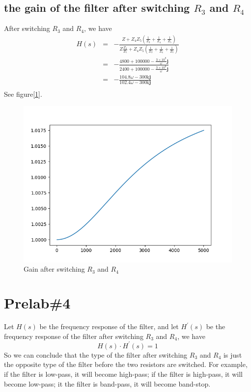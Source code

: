 \documentclass{IEEEtran}
\begin{document}
	\subsection{the gain of the filter after switching $ R_3 $ and $ R_4 $}
	After switching $ R_3 $ and $ R_4 $, we have\\
	\begin{eqnarray*}
		H(s) & = & -\frac{Z + Z_4Z_5(\frac{1}{Z_3}+\frac{1}{Z_4}+\frac{1}{Z_5})} {Z\frac{Z_4}{Z_5}+Z_4Z_5(\frac{1}{Z_3}+\frac{1}{Z_4}+\frac{1}{Z_5})}\\
		& = & - \frac{4800+100000-\frac{3\times10^8}{\omega}\mathbf{j}} {2400+100000-\frac{3\times10^8}{\omega}\mathbf{j}}\\
		& = & - \frac{104.8\omega - 300\mathrm{k}\mathbf{j}}{102.4\omega - 300\mathrm{k}\mathbf{j}}\\
	\end{eqnarray*}
	See figure[\ref{fig:3.2}].
	
	\begin{figure}[!htbp]
		\centering
		\begin{framed}
			\includegraphics[width=\linewidth]{images/3_2.png}
			\caption{Gain after switching $ R_3 $ and $ R_4 $}
			\label{fig:3.2}
		\end{framed}
	\end{figure}

	\section{\textbf{Prelab\#4}}
	Let $ H(s) $ be the frequency response of the filter, and let $ H^\prime(s) $ be the frequency response of the filter after switching $ R_3 $ and $ R_4 $, we have\\
	\begin{equation*}
		H(s)\cdot H^\prime(s) = 1
	\end{equation*}
	\phantom{ } So we can conclude that the type of the filter after switching $ R_3 $ and $ R_4 $ is just the opposite type of the filter before the two resistors are switched. For example, if the filter is low-pass, it will become high-pass; if the filter is high-pass, it will become low-pass; it the filter is band-pass, it will become band-stop.
	
\end{document}

